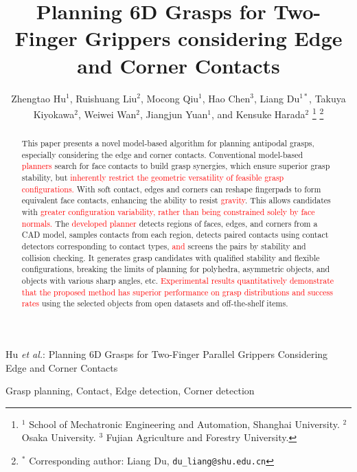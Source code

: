 \documentclass[journal]{IEEEtran}
\newcommand{\rev}[1]{\textcolor{red}{#1}}
\begin{document}
\title{Planning 6D Grasps for Two-Finger Grippers considering Edge and Corner Contacts}
\author{Zhengtao Hu$^{1}$, Ruishuang Liu$^{2}$, Mocong Qiu$^{1}$, Hao Chen$^{3}$, Liang Du$^{1*}$, Takuya Kiyokawa$^{2}$, Weiwei Wan$^{2}$, Jiangjun Yuan$^{1}$, and Kensuke Harada$^{2}$
\thanks{$^{1}$ School of Mechatronic Engineering and Automation, Shanghai University. $^{2}$ Osaka University. $^{3}$ Fujian Agriculture and Forestry University.}
\thanks{$^{*}$ Corresponding author: Liang Du, {\tt\small du\_liang@shu.edu.cn}}%
}
{Hu \MakeLowercase{\textit{et al.}}: Planning 6D Grasps for Two-Finger Parallel Grippers Considering Edge and Corner Contacts} 
\maketitle

\begin{abstract}
This paper presents a novel model-based algorithm for planning antipodal grasps, especially considering the edge and corner contacts. Conventional model-based \rev{planners} search for face contacts to build grasp synergies, which ensure superior grasp stability, but \rev{inherently restrict the geometric versatility of feasible grasp configurations.}
With soft contact, edges and corners can reshape fingerpads to form equivalent face contacts, enhancing the ability to resist \rev{gravity}. This allows candidates with \rev{greater configuration variability, rather than being constrained solely by face normals.}
The \rev{developed planner} detects regions of faces, edges, and corners from a CAD model, samples contacts from each region, detects paired contacts using contact detectors corresponding to contact types, \rev{and} screens the pairs by stability and collision checking. 
It generates grasp candidates with qualified stability and flexible configurations, breaking the limits of planning for polyhedra, asymmetric objects, and objects with
various sharp angles, etc. \rev{Experimental results quantitatively demonstrate that the proposed method has superior performance on grasp distributions and success rates} using the selected objects from open datasets and off-the-shelf items.
\end{abstract}

\begin{IEEEkeywords}
    Grasp planning, Contact, Edge detection, Corner detection  
\end{IEEEkeywords}
\end{document}
